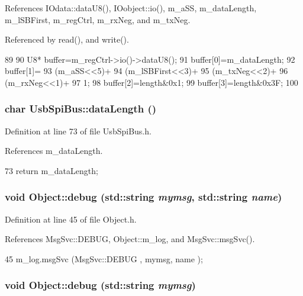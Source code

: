 References IOdata::dataU8(), IOobject::io(), m\_\-aSS, m\_\-dataLength, m\_\-lSBFirst, m\_\-regCtrl, m\_\-rxNeg, and m\_\-txNeg.

Referenced by read(), and write().


\begin{DoxyCode}
89                                 {
90   U8* buffer=m_regCtrl->io()->dataU8();
91   buffer[0]=m_dataLength;
92   buffer[1]=
93     (m_aSS<<5)+
94     (m_lSBFirst<<3)+
95     (m_txNeg<<2)+
96     (m_rxNeg<<1)+
97     1;
98   buffer[2]=length&0x1;
99   buffer[3]=length&0x3F;  
100 }
\end{DoxyCode}
\hypertarget{classUsbSpiBus_ae7d38b275b5267f795b2d9f1d561d688}{
\subsubsection[{dataLength}]{\setlength{\rightskip}{0pt plus 5cm}char UsbSpiBus::dataLength ()}}
\label{classUsbSpiBus_ae7d38b275b5267f795b2d9f1d561d688}


Definition at line 73 of file UsbSpiBus.h.

References m\_\-dataLength.


\begin{DoxyCode}
73 { return m_dataLength; }
\end{DoxyCode}
\hypertarget{classObject_a6c9a0397ca804e04d675ed05683f5420}{
\subsubsection[{debug}]{\setlength{\rightskip}{0pt plus 5cm}void Object::debug (std::string {\em mymsg}, \/  std::string {\em name})}}
\label{classObject_a6c9a0397ca804e04d675ed05683f5420}


Definition at line 45 of file Object.h.

References MsgSvc::DEBUG, Object::m\_\-log, and MsgSvc::msgSvc().


\begin{DoxyCode}
45 { m_log.msgSvc (MsgSvc::DEBUG   , mymsg, name ); }
\end{DoxyCode}
\hypertarget{classObject_aac010553f022165573714b7014a15f0d}{
\subsubsection[{debug}]{\setlength{\rightskip}{0pt plus 5cm}void Object::debug (std::string {\em mymsg})}}
\label{classObject_aac010553f022165573714b7014a15f0d}


